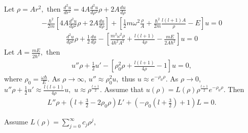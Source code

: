        Let $\rho=Ar^2,$ then $\frac{d^2u}{dr^2}=4A\frac{d^2u}{d\rho^2}\rho + 2A\frac{du}{d\rho}$
       \begin{align*}
           -\frac{\hbar^2}{2m}\left[
           4A\frac{d^2u}{d\rho^2}\rho + 2A\frac{du}{d\rho}
           \right] + 
           \left[
           \frac{1}{2}m\omega^2\frac{\rho}{A}
           +\frac{\hbar^2}{2m}
           \frac{l(l+1)A}{\rho}
           -E
           \right]u = 0
       \end{align*}
       \begin{align*}
           \frac{d^2u}{d\rho^2}\rho + 
           \frac{1}{2}\frac{du}{d\rho}
           -
           \left[
           \frac{m^2\omega^2\rho}{4\hbar^2A^2}
           +
           \frac{l(l+1)}{4\rho}
           -\frac{mE}{2A\hbar^2}
           \right]u = 0
       \end{align*}
       Let $A=\frac{mE}{2\hbar^2},$ then
       \begin{align*}
           u''\rho+\frac{1}{2}u'
           -\left[\rho^2_0\rho + \frac{l(l+1)}{4\rho}
           -1\right]u=0,
       \end{align*}
       where $\rho_0=\frac{\omega\hbar}{E}.$
       As $\rho\to\infty$,  $u''\approx\rho_0^2u,$ thus $u\approx e^{-\rho_0\rho}.$
       As $\rho\to 0$,  $u''\rho+\frac{1}{2}u'\approx\frac{l(l+1)}{4\rho}u,$
       $u\approx \rho^{\frac{l+1}{2}}.$ Assume that 
       $u(\rho)=L(\rho)\rho^{\frac{l+1}{2}}e^{-\rho_0\rho}.$
       Then 
       \begin{align*}
          L''\rho  + (l+\frac{3}{2}-2\rho_0\rho)L' 
          +(-\rho_0(l+\frac{3}{2})+1)L 
          = 0.
      \end{align*} 
      
      Assume $L(\rho)=\sum_{j=0}^\infty c_j\rho^j,$

